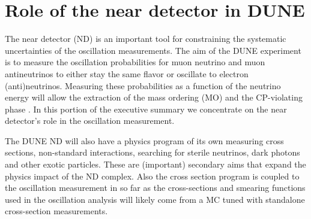 

\section{Role of the near detector in DUNE}
\label{sec:exsum-nd-role}
%


The near detector (ND) is an important tool for constraining the systematic uncertainties of the oscillation measurements. The aim of the DUNE experiment is to measure the oscillation probabilities for muon neutrino and muon antineutrinos to either stay the same flavor or oscillate to electron (anti)neutrinos. Measuring these probabilities as a function of the neutrino energy will allow the extraction of the mass ordering (MO) and the CP-violating phase \deltacp. In this portion of the executive summary we concentrate on the near detector's role in the oscillation measurement.

The DUNE ND will also have a physics program of its own measuring cross sections, non-standard interactions, searching for sterile neutrinos, dark photons and other exotic particles. These are (important) secondary aims that expand the physics impact of the ND complex.  Also the cross section program is coupled to the oscillation measurement in so far as the cross-sections and smearing functions used in the oscillation analysis will likely come from a MC tuned with standalone cross-section measurements.

